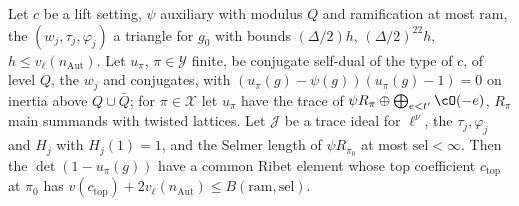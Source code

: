 \begin{theorem}
\label{cg-first:thm:ribet}
Let $c$ be a lift setting, $\psi$ auxiliary with modulus $Q$ and ramification at most $\mathrm{ram}$,
the $(w_j,\tau_j,\varphi_j)$ a triangle for $g_0$ with bounds $(\Delta/2)h$, $(\Delta/2)^{22}h$,
$h\le v_\ell(n_{\mathrm{Aut}})$. Let $u_\pi$, $\pi\in\mathcal Y$ finite, be conjugate self-dual of the type of $c$, of level
$Q$, the $w_j$ and conjugates, with $(u_\pi(g)-\psi(g))(u_\pi(g)-1)=0$ on inertia above $Q\cup\bar Q$; for
$\pi\in\mathcal X$ let $u_\pi$ have the trace of $\psi R_\pi\oplus\bigoplus_{e<t'}\cO(-e)$, $R_\pi$ main summands
with twisted lattices. Let $\mathcal J$ be a trace ideal for $\ell^\nu$, the $\tau_j,\varphi_j$ and $H_j$
with $H_j(1)=1$, and the Selmer length of $\psi R_{\pi_0}$ at most $\mathrm{sel}<\infty$. Then the
$\det(1-u_\pi(g))$ have a common Ribet element whose top coefficient $c_{\mathrm{top}}$ at $\pi_0$ has
$v(c_{\mathrm{top}})+2v_\ell(n_{\mathrm{Aut}})\le B(\mathrm{ram},\mathrm{sel})$.
\end{theorem}

